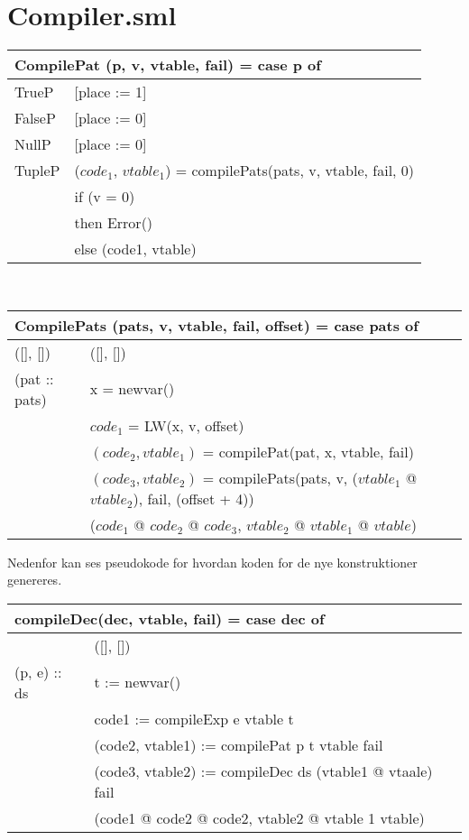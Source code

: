 \documentclass [10pt,a4paper]{article}
\begin{document}
\section{Compiler.sml}
\begin{tabular}{|l|l|}
  \hline
  \multicolumn{2}{|l|}{CompilePat (p, v, vtable, fail) = case p of} \\
	\hline
	TrueP & [place := 1] \\
	\hline
	FalseP & [place := 0] \\ 
	\hline
	NullP & [place := 0] \\ 
	\hline
	TupleP & ($code_1$, $vtable_1$) = compilePats(pats, v, vtable, fail, 0) \\ 
		   & if (v = 0) \\
		   & then Error() \\
		   & else (code1, vtable) \\
	\hline
\end{tabular}
\\
\begin{tabular}{|l|l|}
  \hline
  \multicolumn{2}{|l|}{CompilePats (pats, v, vtable, fail, offset) = case pats of} \\
	\hline
	([], []) & ([], []) \\
	\hline
	(pat :: pats) & x = newvar() \\
	& $code_1$ = LW(x, v, offset) \\
	& $(code_2, vtable_1)$ = compilePat(pat, x, vtable, fail) \\
	& $(code_3, vtable_2)$ = compilePats(pats, v, ($vtable_1$ @ $vtable_2$), fail, (offset + 4)) \\
	& ($code_1$ @ $code_2$ @ $code_3$, $vtable_2$ @ $vtable_1$ @ $vtable$) \\
	\hline
\end{tabular}

Nedenfor kan ses pseudokode for hvordan koden for de nye
konstruktioner genereres.

\begin{tabular}{|l|l|}
  \hline
  \multicolumn{2}{|l|}{compileDec(dec, vtable, fail) = case dec of}
  \\ \hline
  [] & ([], []) \\ \hline
  (p, e) :: ds & t := newvar() \\
  & code1 := compileExp e vtable t \\
  & (code2, vtable1) := compilePat p t vtable fail \\
  & (code3, vtable2) := compileDec ds (vtable1 @ vtaale) fail \\
  & (code1 @ code2 @ code2, vtable2 @ vtable 1 vtable) \\ \hline
\end{tabular}
\end{document}
